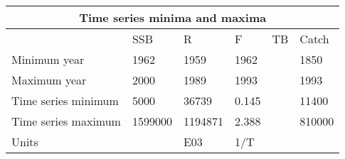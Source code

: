 \begin{table}[htb]
\centering
\begin{tabular}{llllll}
\toprule
\multicolumn{6}{c}{\textbf{Time series minima and maxima}} \\
\midrule
                    & SSB     & R       & F     & TB & Catch  \\
Minimum year        & 1962    & 1959    & 1962  &    & 1850   \\
Maximum year        & 2000    & 1989    & 1993  &    & 1993   \\
Time series minimum & 5000    & 36739   & 0.145 &    & 11400  \\
Time series maximum & 1599000 & 1194871 & 2.388 &    & 810000 \\
Units               &         & E03     & 1/T   &    &        \\
\bottomrule
\end{tabular}
\label{tab:timetab}
\end{table}
